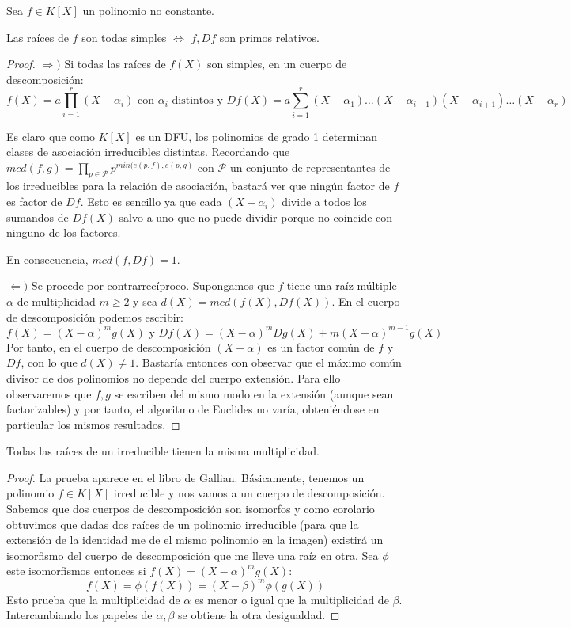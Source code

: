 \begin{lemma}
Sea $f \in K[X]$ un polinomio no constante. 

Las raíces de $f$ son todas simples $\iff$ $f,Df$ son primos relativos. 
\end{lemma}
\begin{proof}
$\Rightarrow)$ Si todas las raíces de $f(X)$ son simples, en un cuerpo de descomposición: $$f(X) = a \prod_{i = 1}^r (X - \alpha_i) \text{ con } \alpha_i \text{ distintos y } Df(X) = a \sum_{i = 1}^r (X-\alpha_1) \ldots (X - \alpha_{i-1}) (X - \alpha_{i+1}) \ldots (X - \alpha_r)$$

Es claro que como $K[X]$ es un DFU, los polinomios de grado 1 determinan clases de asociación irreducibles distintas. Recordando que $mcd(f,g) = \prod_{p \in \mathcal{P}} p^{min(e(p,f),e(p,g)}$ con $\mathcal{P}$ un conjunto de representantes de los irreducibles para la relación de asociación, bastará ver que ningún factor de $f$ es factor de $Df$. Esto es sencillo ya que cada $(X-\alpha_i)$ divide a todos los sumandos de $Df(X)$ salvo a uno que no puede dividir porque no coincide con ninguno de los factores. 

En consecuencia, $mcd(f,Df) = 1$. 

$\Leftarrow)$ Se procede por contrarrecíproco. Supongamos que $f$ tiene una raíz múltiple $\alpha$ de multiplicidad $m \ge 2$ y sea $d(X) = mcd(f(X),Df(X))$. En el cuerpo de descomposición podemos escribir: $$f(X) = (X - \alpha)^m g(X) \text{ y } Df(X) = (X - \alpha)^m Dg(X) + m(X - \alpha)^{m-1}g(X)$$ Por tanto, en el cuerpo de descomposición $(X - \alpha)$ es un factor común de $f$ y $Df$, con lo que $d(X) \neq 1$. Bastaría entonces con observar que el máximo común divisor de dos polinomios no depende del cuerpo extensión. Para ello observaremos que $f,g$ se escriben del mismo modo en la extensión (aunque sean factorizables) y por tanto, el algoritmo de Euclides no varía, obteniéndose en particular los mismos resultados.
\end{proof}

\begin{lemma}
Todas las raíces de un irreducible tienen la misma multiplicidad.
\end{lemma}
\begin{proof}
La prueba aparece en el libro de Gallian. Básicamente, tenemos un polinomio $f \in K[X]$ irreducible y nos vamos a un cuerpo de descomposición. Sabemos que dos cuerpos de descomposición son isomorfos y como corolario obtuvimos que dadas dos raíces de un polinomio irreducible (para que la extensión de la identidad me de el mismo polinomio en la imagen) existirá un isomorfismo del cuerpo de descomposición que me lleve una raíz en otra. Sea $\phi$ este isomorfismos entonces si $f(X) = (X-\alpha)^mg(X)$: $$f(X) = \phi(f(X)) = (X - \beta)^m \phi(g(X))$$ Esto prueba que la multiplicidad de $\alpha$ es menor o igual que la multiplicidad de $\beta$. Intercambiando los papeles de $\alpha, \beta$ se obtiene la otra desigualdad. 
\end{proof}

